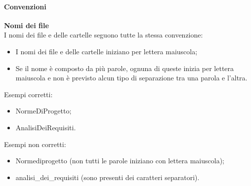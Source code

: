 \paragraph{Convenzioni}

\textbf{Nomi dei file}\\
I nomi dei file e delle cartelle seguono tutte la stessa convenzione:

\begin{itemize}

	\item I nomi dei file e delle cartelle iniziano per lettera maiuscola;
	
	\item Se il nome è composto da più parole, ognuna di queste inizia per lettera maiuscola e non è previsto alcun tipo di separazione tra una parola e l'altra.
	
\end{itemize}

Esempi corretti:

\begin{itemize}

	\item NormeDiProgetto;
	
	\item AnalisiDeiRequisiti.
	
\end{itemize}

Esempi non corretti:

\begin{itemize}

	\item Normediprogetto (non tutti le parole iniziano con lettera maiuscola);
	
	\item analisi\_dei\_requisiti (sono presenti dei caratteri separatori).
\end{itemize}

\mbox{}

